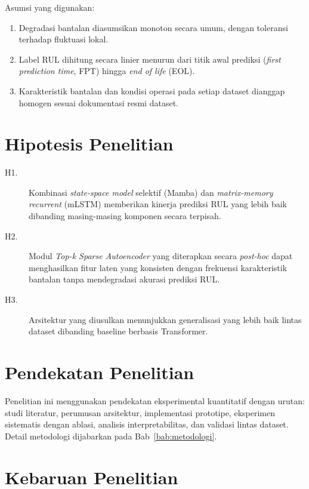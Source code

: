 Asumsi yang digunakan:

\begin{enumerate}
  \item Degradasi bantalan diasumsikan monoton secara umum, dengan
        toleransi terhadap fluktuasi lokal.
  \item Label RUL dihitung secara linier menurun dari titik awal
        prediksi (\emph{first prediction time}, FPT) hingga \emph{end
        of life} (EOL).
  \item Karakteristik bantalan dan kondisi operasi pada setiap
        dataset dianggap homogen sesuai dokumentasi resmi dataset.
\end{enumerate}

\section{Hipotesis Penelitian}
\label{subsec:bab1_hipotesis}

\begin{description}
  \item[H1.] Kombinasi \emph{state-space model} selektif (Mamba) dan
        \emph{matrix-memory recurrent} (mLSTM) memberikan kinerja
        prediksi RUL yang lebih baik dibanding masing-masing komponen
        secara terpisah.
  \item[H2.] Modul \emph{Top-k Sparse Autoencoder} yang diterapkan
        secara \emph{post-hoc} dapat menghasilkan fitur laten yang
        konsisten dengan frekuensi karakteristik bantalan tanpa
        mendegradasi akurasi prediksi RUL.
  \item[H3.] Arsitektur yang diusulkan menunjukkan generalisasi yang
        lebih baik lintas dataset dibanding baseline berbasis
        Transformer.
\end{description}

\section{Pendekatan Penelitian}
\label{subsec:bab1_pendekatan}

Penelitian ini menggunakan pendekatan eksperimental kuantitatif
dengan urutan: studi literatur, perumusan arsitektur, implementasi
prototipe, eksperimen sistematis dengan ablasi, analisis
interpretabilitas, dan validasi lintas dataset. Detail metodologi
dijabarkan pada Bab~\ref{bab:metodologi}.

\section{Kebaruan Penelitian}
\label{subsec:bab1_kebaruan}

